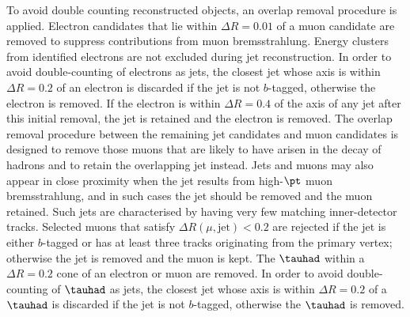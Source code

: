 \documentclass[PAPER, coverpage, atlasdraft=true, texlive=2016, UKenglish]{\ATLASLATEXPATH atlasdoc} %
\begin{document}
To avoid double counting reconstructed objects, an overlap removal procedure is applied.
Electron candidates that lie 
within $\Delta R = 0.01$ of a muon candidate are removed to suppress contributions from muon bremsstrahlung. 
Energy clusters from identified electrons are not excluded during jet reconstruction. 
In order to avoid double-counting of electrons as jets, the closest jet whose axis is within ${\Delta}R = 0.2$ of an electron 
is discarded if the jet is not $b$-tagged, otherwise the electron is removed.
If the electron is within ${\Delta}R = 0.4$ of the axis of any jet after this initial removal, the jet is retained and  the electron is removed.
The overlap removal procedure between the remaining jet candidates and muon candidates is designed to remove those muons 
that are likely to have arisen in the decay of hadrons and to retain the overlapping jet instead. 
Jets and muons may also appear in close proximity when the jet results from high-$\pt$ muon bremsstrahlung, 
and in such cases the jet should be removed and the muon retained. Such jets are characterised by having very 
few matching inner-detector tracks. Selected muons that satisfy $\Delta R(\mu,{\textrm{jet}}) < 0.2$ are rejected
if the jet is either $b$-tagged or has at least three tracks originating from the primary vertex; otherwise the jet is removed and the muon is kept.
The $\tauhad$ within a $\Delta R=0.2$ cone of an electron or muon are removed.
In order to avoid double-counting of $\tauhad$ as jets, the closest jet whose axis is
within ${\Delta}R = 0.2$ of a $\tauhad$ is discarded if the jet is not $b$-tagged, otherwise the $\tauhad$ is removed. 
\end{document}
